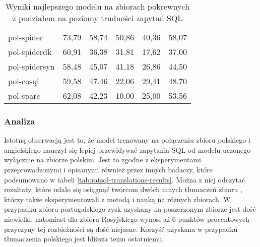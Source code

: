 \begin{table}[ht!]
    \centering
    \begin{tabular}{|l|R{0.10\textwidth}|R{0.10\textwidth}|R{0.10\textwidth}|R{0.10\textwidth}|R{0.10\textwidth}|}
        \hline
         &  &  &  &  &  \\
        \hline
        pol-spider & 73,79 & 58,74 & 50,86 & 40,36 & 58,07 \\
        pol-spiderdk & 60,91 & 36,38 & 31,81 & 17,62 & 37,00 \\
        pol-spidersyn & 58,48 & 45,07  & 41,18  & 26,86  & 44,50 \\
        pol-cosql & 59,58 & 47.46  & 22,06  & 29,41  & 48.70 \\
        pol-sparc & 62,08 & 42,23  & 10,00  & 25,00  & 53,56 \\
        \hline
    \end{tabular}
    \caption{Wyniki najlepszego modelu  na zbiorach pokrewnych z podziałem na poziomy trudności zapytań SQL}
    \label{tab:ratsql-difficulty}
\end{table}

\subsubsection{Analiza}
Istotną obserwacją jest to, że model trenowany na połączeniu zbioru polskiego i angielskiego nauczył się lepiej przewidywać zapytania SQL od modelu uczonego wyłącznie na zbiorze polskim. Jest to zgodne z eksperymentami przeprowadzonymi i opisanymi również przez innych badaczy, które podsumowano w tabeli \ref{tab:ratsql-translations-results}. Można z niej odczytać rezultaty, które udało się osiągnąć twórcom dwóch innych tłumaczeń zbioru , którzy także eksperymentowali z metodą  i nauką na różnych zbiorach. W przypadku zbioru portugalskiego zysk uzyskany na poszerzonym zbiorze jest dość niewielki, natomiast dla zbioru Rosyjskiego wynosi aż 6 punktów procentowych - przyczyny tej rozbieżności są dość niejasne. Korzyść uzyskana w przypadku tłumaczenia polskiego jest bliższa temu ostatniemu. 


